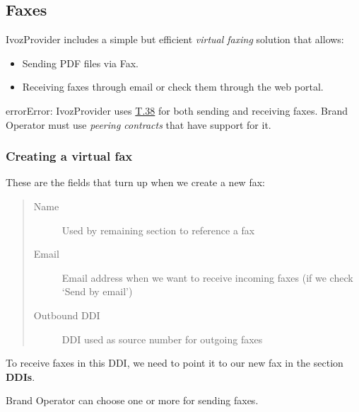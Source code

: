 \documentclass[letterpaper,10pt,spanish]{sphinxmanual}
\begin{document}
\subsection{Faxes}
\label{administration_portal/client/vpbx/faxes:faxes}\label{administration_portal/client/vpbx/faxes::doc}\label{administration_portal/client/vpbx/faxes:faxing-system}\label{administration_portal/client/vpbx/faxes:id1}
IvozProvider includes a simple but efficient \emph{virtual faxing} solution that allows:
\begin{itemize}
\item {} 
Sending PDF files via Fax.

\item {} 
Receiving faxes through email or check them through the web portal.

\end{itemize}

\begin{notice}{error}{Error:}
IvozProvider uses
\href{http://www.voip-info.org/wiki/view/T.38}{T.38} for both sending and receiving
faxes. Brand Operator must use \emph{peering contracts} that have support for it.
\end{notice}


\subsubsection{Creating a virtual fax}
\label{administration_portal/client/vpbx/faxes:creating-a-virtual-fax}
These are the fields that turn up when we create a new fax:
\begin{quote}
\begin{description}
\item[{Name}] \leavevmode
Used by remaining section to reference a fax

\item[{Email}] \leavevmode
Email address when we want to receive incoming faxes (if we check `Send
by email')

\item[{Outbound DDI}] \leavevmode
DDI used as source number for outgoing faxes

\end{description}
\end{quote}

To receive faxes in this DDI, we need to point it to our new fax in the section
\textbf{DDIs}.

Brand Operator can choose one or more {\hyperref[administration_portal/brand/routing/outgoing_routings:outgoing\string-routings]{}} for sending faxes.
\end{document}
